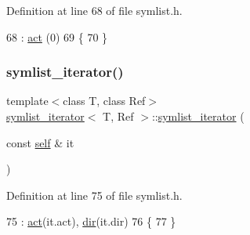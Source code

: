 Definition at line 68 of file symlist.\+h.


\begin{DoxyCode}
68                        : \mbox{\hyperlink{structsymlist__iterator_a1c7a0193ab85baa7705070975d841fc8}{act}} (0)
69     \{
70     \}
\end{DoxyCode}
\mbox{\label{structsymlist__iterator_ad2bfdc772635fde5f302c197e3aecb3a}} 
\subsubsection{\texorpdfstring{symlist\+\_\+iterator()}{symlist\_iterator()}\hspace{0.1cm}{\footnotesize\ttfamily [2/4]}}
{\footnotesize\ttfamily template$<$class T, class Ref$>$ \\
\mbox{\hyperlink{structsymlist__iterator}{symlist\+\_\+iterator}}$<$ T, Ref $>$\+::\mbox{\hyperlink{structsymlist__iterator}{symlist\+\_\+iterator}} (\begin{DoxyParamCaption}\item[{const \mbox{\hyperlink{structsymlist__iterator_ae1426e0085d4c88445c0a84675ee7d38}{self}} \&}]{it }\end{DoxyParamCaption})\hspace{0.3cm}{\ttfamily [inline]}}



Definition at line 75 of file symlist.\+h.


\begin{DoxyCode}
75                                      : \mbox{\hyperlink{structsymlist__iterator_a1c7a0193ab85baa7705070975d841fc8}{act}}(it.act), \mbox{\hyperlink{structsymlist__iterator_a8433e558ceb6b17b225414ef46b4a3e2}{dir}}(it.dir)
76     \{
77     \}
\end{DoxyCode}
\mbox{\label{structsymlist__iterator_addbd9bd7f755bf6272b0f4cc0c37cd5e}} 
